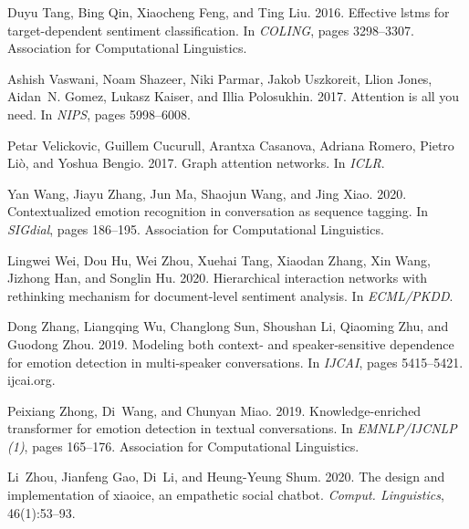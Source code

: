\documentclass[11pt,a4paper]{article}
\begin{document}
\begin{thebibliography}{45}
  Duyu Tang, Bing Qin, Xiaocheng Feng, and Ting Liu. 2016.
  \newblock Effective lstms for target-dependent sentiment classification.
  \newblock In \emph{{COLING}}, pages 3298--3307. Association for Computational
    Linguistics.
  
  Ashish Vaswani, Noam Shazeer, Niki Parmar, Jakob Uszkoreit, Llion Jones,
    Aidan~N. Gomez, Lukasz Kaiser, and Illia Polosukhin. 2017.
  \newblock Attention is all you need.
  \newblock In \emph{{NIPS}}, pages 5998--6008.
  
  Petar Velickovic, Guillem Cucurull, Arantxa Casanova, Adriana Romero, Pietro
    Li{\`{o}}, and Yoshua Bengio. 2017.
  \newblock Graph attention networks.
  \newblock In \emph{{ICLR}}.
  
  Yan Wang, Jiayu Zhang, Jun Ma, Shaojun Wang, and Jing Xiao. 2020.
  \newblock Contextualized emotion recognition in conversation as sequence
    tagging.
  \newblock In \emph{SIGdial}, pages 186--195. Association for Computational
    Linguistics.
  
  Lingwei Wei, Dou Hu, Wei Zhou, Xuehai Tang, Xiaodan Zhang, Xin Wang, Jizhong
    Han, and Songlin Hu. 2020.
  \newblock Hierarchical interaction networks with rethinking mechanism for
    document-level sentiment analysis.
  \newblock In \emph{{ECML/PKDD}}.
  
  Dong Zhang, Liangqing Wu, Changlong Sun, Shoushan Li, Qiaoming Zhu, and Guodong
    Zhou. 2019.
  \newblock Modeling both context- and speaker-sensitive dependence for emotion
    detection in multi-speaker conversations.
  \newblock In \emph{{IJCAI}}, pages 5415--5421. ijcai.org.
  
  Peixiang Zhong, Di~Wang, and Chunyan Miao. 2019.
  \newblock Knowledge-enriched transformer for emotion detection in textual
    conversations.
  \newblock In \emph{{EMNLP/IJCNLP} {(1)}}, pages 165--176. Association for
    Computational Linguistics.
  
  Li~Zhou, Jianfeng Gao, Di~Li, and Heung{-}Yeung Shum. 2020.
  \newblock The design and implementation of xiaoice, an empathetic social
    chatbot.
  \newblock \emph{Comput. Linguistics}, 46(1):53--93.
  
  \end{thebibliography}

  
\end{document}
